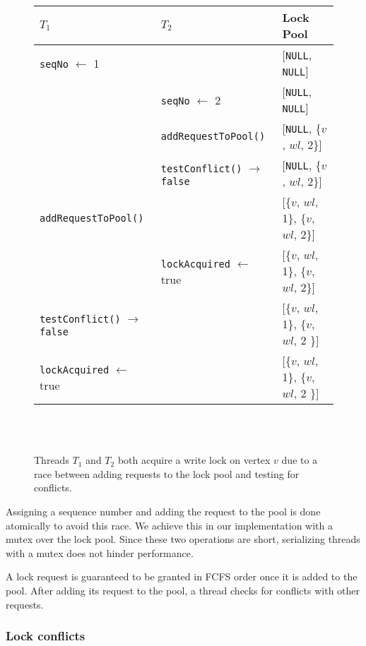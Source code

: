 \begin{figure}
	\centering
	\captionsetup{justification=centering}
	\begin{tabular}{lll}
		\textbf{$T_1$} 					& \textbf{$T_2$} 					& Lock Pool\\
		\hline
		\texttt{seqNo} $\leftarrow$ 1 			&				 			&	[\texttt{NULL}, \texttt{NULL}]	\\
										& \texttt{seqNo} $\leftarrow$ 2		&   [\texttt{NULL}, \texttt{NULL}]		 \\	
										& \texttt{addRequestToPool()}		&	[\texttt{NULL}, \{$v$, $wl$, 2\}]\\
										& \texttt{testConflict()} $\rightarrow$ \texttt{false} &	[\texttt{NULL}, \{$v$, $wl$, 2\}]\\
		\texttt{addRequestToPool()}			&				 			&	[\{$v$, $wl$, 1\}, \{$v$, $wl$, 2\}]\\
		&	\texttt{lockAcquired} $\leftarrow$ true			&	[\{$v$, $wl$, 1\}, \{$v$, $wl$, 2\}]\\
		\texttt{testConflict()} $\rightarrow$ \texttt{false}	&				 			&	[\{$v$, $wl$, 1\}, \{$v$, $wl$, 2 \}]\\
		\texttt{lockAcquired} $\leftarrow$ true		&				 			&	[\{$v$, $wl$, 1\}, \{$v$, $wl$, 2 \}]\\
	\end{tabular} \\~\\
	\caption{Threads $T_1$ and $T_2$ both acquire a write lock on vertex $v$ due to a race between adding requests to the lock pool and testing for conflicts.} \label{fig:raceCondition}
\end{figure}

Assigning a sequence number and adding the request to the pool is done atomically to avoid this race. We achieve this in our implementation with a mutex over the lock pool. Since these two operations are short, serializing threads with a mutex does not hinder performance. 

A lock request is guaranteed to be granted in FCFS order once it is added to the pool. After adding its request to the pool, a thread checks for conflicts with other requests.

\subsubsection{Lock conflicts}

